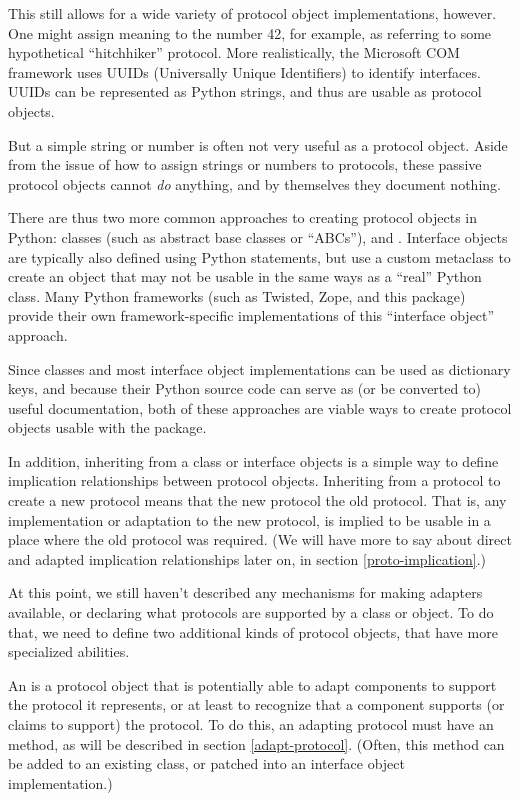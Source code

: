 \begin{verbatim%
}
\begin{verbatim%
}
This still allows for a wide variety of protocol object implementations,
however.  One might assign meaning to the number 42, for example, as
referring to some hypothetical ``hitchhiker'' protocol.  More realistically,
the Microsoft COM framework uses UUIDs (Universally Unique Identifiers) to
identify interfaces.  UUIDs can be represented as Python strings, and thus
are usable as protocol objects.





But a simple string or number is often not very useful as a protocol
object.  Aside from the issue of how to assign strings or numbers to
protocols, these passive protocol objects cannot \emph{do} anything, and by
themselves they document nothing.

There are thus two more common approaches to creating protocol objects in
Python: classes (such as abstract base classes or ``ABCs''), and .  Interface objects are typically also defined using Python
 statements, but use a custom metaclass to create an object
that may not be usable in the same ways as a ``real'' Python class.  Many
Python frameworks (such as Twisted, Zope, and this package) provide their own
framework-specific implementations of this ``interface object'' approach.

Since classes and most interface object implementations can be used as
dictionary keys, and because their Python source code can serve as (or
be converted to) useful documentation, both of these approaches are viable
ways to create protocol objects usable with the  package.

In addition, inheriting from a class or interface objects is a simple way to
define implication relationships between protocol objects.  Inheriting from a
protocol to create a new protocol means that the new protocol 
the old protocol.  That is, any implementation or adaptation to the new
protocol, is implied to be usable in a place where the old protocol was
required.  (We will have more to say about direct and adapted implication
relationships later on, in section \ref{proto-implication}.)

At this point, we still haven't described any mechanisms for making adapters
available, or declaring what protocols are supported by a class or object.
To do that, we need to define two additional kinds of protocol objects, that
have more specialized abilities.

An  is a protocol object that is potentially able to
adapt components to support the protocol it represents, or at least to
recognize that a component supports (or claims to support) the protocol.  To
do this, an adapting protocol must have an  method, as
will be described in section \ref{adapt-protocol}.  (Often, this method
can be added to an existing class, or patched into an interface object
implementation.)




\end{verbatim%
}
\end{verbatim%
}
